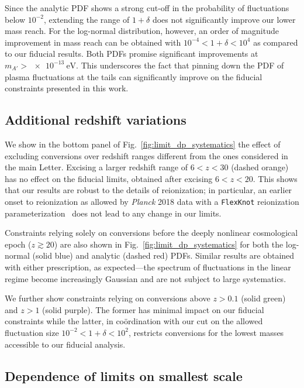 \documentclass[prd,aps,10pt,nofootinbib,twocolumn,superscriptaddress,preprintnumbers,balancelastpage,longbibliography]{revtex4-1}
\begin{document}
Since the analytic PDF shows a strong cut-off in the probability of fluctuations below $10^{-2}$, extending the range of $1+\delta$ does not significantly improve our lower mass reach. For the log-normal distribution, however, an order of magnitude improvement in mass reach can be obtained with $10^{-4} < 1+\delta < 10^4$ as compared to our fiducial results. Both PDFs promise significant improvements at $m_{A'} > \SI{e-13}{\eV}$. This underscores the fact that pinning down the PDF of plasma fluctuations at the tails can significantly improve on the fiducial constraints presented in this work.

\subsection{Additional redshift variations}

We show in the bottom panel of Fig.~\ref{fig:limit_dp_systematics} the effect of excluding conversions over redshift ranges different from the ones considered in the main Letter. Excising a larger redshift range of $6 < z < 30$ (dashed orange) has no effect on the fiducial limits, obtained after excising $6 < z < 20$. This shows that our results are robust to the details of reionization; in particular, an earlier onset to reionization as allowed by \emph{Planck} 2018 data with a \texttt{FlexKnot} reionization parameterization~\cite{Aghanim:2018eyx} does not lead to any change in our limits.

Constraints relying solely on conversions before the deeply nonlinear cosmological epoch ($z \gtrsim 20$)  are also shown in Fig.~\ref{fig:limit_dp_systematics} for both the log-normal (solid blue) and analytic (dashed red) PDFs. Similar results are obtained with either prescription, as expected---the spectrum of fluctuations in the linear regime become increasingly Gaussian and are not subject to large systematics.

We further show constraints relying on conversions above $z > 0.1$ (solid green) and $z > 1$ (solid purple). The former has minimal impact on our fiducial constraints while the latter, in co\"ordination with our cut on the allowed fluctuation size $10^{-2} < 1 + \delta < 10^2$, restricts conversions for the lowest masses accessible to our fiducial analysis. \\


\subsection{Dependence of limits on smallest scale}
\end{document}
